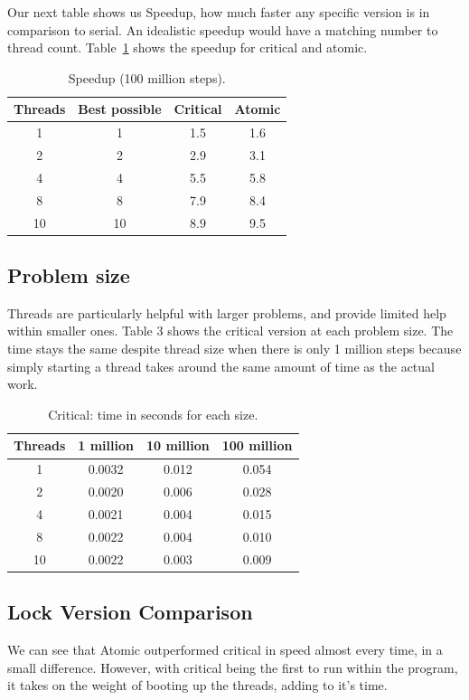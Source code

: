\documentclass[11pt,twocolumn]{article}
\begin{document}
Our next table shows us Speedup, how much faster any specific version is in comparison to serial. An idealistic speedup would have a matching number to thread count.  Table~\ref{tab:speedup} shows the speedup for critical and atomic.

\begin{table}[h]
\centering
\begin{tabular}{|c|c|c|c|}
\hline
Threads & Best possible & Critical & Atomic \\
\hline
1  & 1  & 1.5 & 1.6 \\
2  & 2  & 2.9 & 3.1 \\
4  & 4  & 5.5 & 5.8 \\
8  & 8  & 7.9 & 8.4 \\
10 & 10 & 8.9 & 9.5 \\
\hline
\end{tabular}
\caption{Speedup (100 million steps).}
\label{tab:speedup}
\end{table}

\subsection{Problem size}
Threads are particularly helpful with larger problems, and provide limited help within smaller ones. Table 3 shows the critical version at each problem size. The time stays the same despite thread size when there is only 1 million steps because simply starting a thread takes around the same amount of time as the actual work.

\begin{table}[h]
\centering
\begin{tabular}{|c|c|c|c|}
\hline
Threads & 1 million & 10 million & 100 million \\
\hline
1  & 0.0032 & 0.012 & 0.054 \\
2  & 0.0020 & 0.006 & 0.028 \\
4  & 0.0021 & 0.004 & 0.015 \\
8  & 0.0022 & 0.004 & 0.010 \\
10 & 0.0022 & 0.003 & 0.009 \\
\hline
\end{tabular}
\caption{Critical: time in seconds for each size.}
\label{tab:size}
\end{table}

\subsection{Lock Version Comparison}
We can see that Atomic outperformed critical in speed almost every time, in a small difference. However, with critical being the first to run within the program, it takes on the weight of booting up the threads, adding to it's time.
\end{document}
